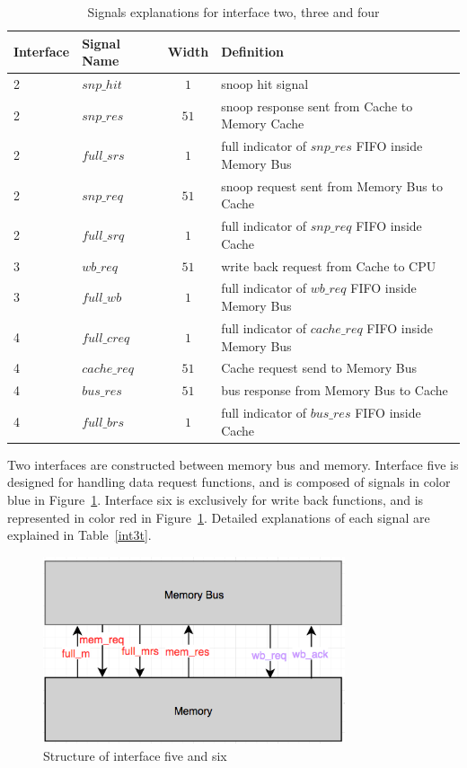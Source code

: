 \documentclass[12pt,frontmatter,copyright,thesis]{usfmanus}
\begin{document}
\begin{table}[h]
\caption{Signals explanations for interface two, three and four}

\begin{tabular}{|l|l|c | p{12cm} |}
\hline
Interface & Signal Name & Width & Definition \\
\hline
\hline
2 & $snp\_hit$ 			&$1$				& snoop hit signal\\
\hline
2 & $snp\_res$ 			&$51$			& snoop response sent from Cache to Memory Cache \\
\hline
2 & $full\_srs$ 			&$1$				& full indicator of $snp\_res$ FIFO inside Memory Bus\\
\hline

2 &$snp\_req$ 			&$51$			& snoop request sent from Memory Bus to Cache \\
\hline
2 &$full\_srq$ 			&$1$				& full indicator of $snp\_req$ FIFO inside Cache\\
\hline


3 & $wb\_req$ 			&$51$			& write back request from Cache to CPU \\
\hline
3 & $full\_wb$ 			&$1$				& full indicator of $wb\_req$ FIFO inside Memory Bus\\
\hline


4 & $full\_creq$ 			&$1$				& full indicator of $cache\_req$ FIFO inside Memory Bus\\
\hline
4 & $cache\_req$ 			&$51$			& Cache request send to Memory Bus\\
\hline
4 & $bus\_res$ 			&$51$			& bus response from Memory Bus to Cache \\
\hline
4 & $full\_brs$ 			&$1$				& full indicator of $bus\_res$ FIFO inside Cache\\
\hline

\end{tabular}
\label{int2t}
\end{table}
Two interfaces are constructed between memory bus and memory.
Interface five is designed for handling data request functions, and is
composed of signals in color blue in Figure~\ref{int3}.
Interface six is exclusively for write back functions, and is represented in
color red in Figure~\ref{int3}.
Detailed explanations of each signal are explained in
Table~\ref{int3t}.
\begin{figure}[h]
\centering
    \includegraphics[width=3.5in]{int3.png}
    \caption{Structure of interface five and six}
    \label{int3}
 \end{figure}
\end{document}
